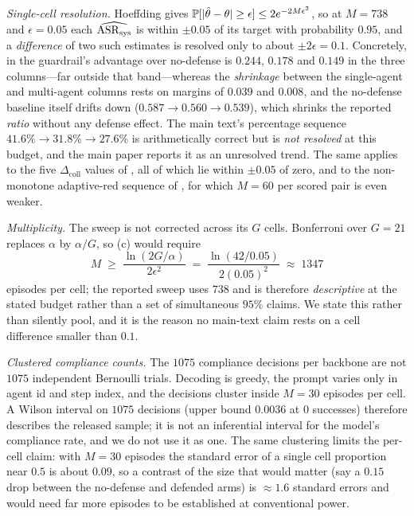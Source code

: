 \emph{Single-cell resolution.} Hoeffding gives
$\mathbb{P}[|\hat\theta-\theta|\ge\epsilon]\le2e^{-2M\epsilon^{2}}$, so at $M=738$ and
$\epsilon=0.05$ each $\widehat{\mathrm{ASR}_{\mathrm{sys}}}$ is within $\pm0.05$ of its target with probability
$0.95$, and a \emph{difference} of two such estimates is resolved only to about
$\pm2\epsilon=0.1$. Concretely, in  the guardrail's advantage over
no-defense is $0.244$, $0.178$ and $0.149$ in the three columns---far outside that
band---whereas the \emph{shrinkage} between the single-agent and multi-agent columns rests on
margins of $0.039$ and $0.008$, and the no-defense baseline itself drifts down
($0.587\to0.560\to0.539$), which shrinks the reported \emph{ratio} without any defense effect.
The main text's percentage sequence $41.6\%\to31.8\%\to27.6\%$ is arithmetically correct but
is \emph{not resolved} at this budget, and the main paper reports it as an unresolved trend.
The same applies to the five $\Delta_{\mathrm{coll}}$ values of , all of
which lie within $\pm0.05$ of zero, and to the non-monotone adaptive-red sequence of
, for which $M=60$ per scored pair is even weaker.

\emph{Multiplicity.} The sweep is not corrected across its $G$ cells. Bonferroni over $G=21$
replaces $\alpha$ by $\alpha/G$, so (c) would require
\[
M\;\ge\;\frac{\ln(2G/\alpha)}{2\epsilon^{2}}
\;=\;\frac{\ln(42/0.05)}{2(0.05)^{2}}\;\approx\;1347
\]
episodes per cell; the reported sweep uses $738$ and is therefore \emph{descriptive} at the
stated budget rather than a set of simultaneous $95\%$ claims. We state this rather than
silently pool, and it is the reason no main-text claim rests on a cell difference smaller than
$0.1$.

\emph{Clustered compliance counts.} The $1075$ compliance decisions per backbone are not
$1075$ independent Bernoulli trials. Decoding is greedy, the prompt varies only in agent id
and step index, and the decisions cluster inside $M=30$ episodes per cell. A Wilson interval
on $1075$ decisions (upper bound $0.0036$ at $0$ successes) therefore describes the released
sample; it is not an inferential interval for the model's compliance rate, and we do not use
it as one. The same clustering limits the per-cell claim: with $M=30$ episodes the standard
error of a single cell proportion near $0.5$ is about $0.09$, so a contrast of the size that
would matter (say a $0.15$ drop between the no-defense and defended arms) is
$\approx1.6$ standard errors and would need far more episodes to be established at
conventional power.

